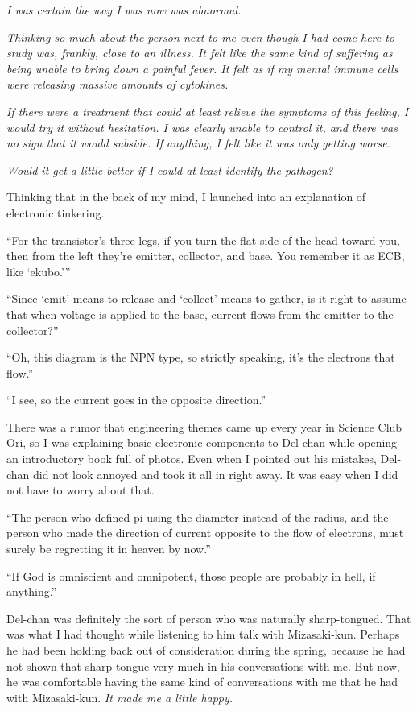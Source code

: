 \documentclass[
    a4paper,
    12pt,
    twoside,
    openany,
    UTF8,
    fontset=windows
]{ctexbook}
\begin{document}
\textit{I was certain the way I was now was abnormal.}

\textit{Thinking so much about the person next to me even though I had come here to study was, frankly, close to an illness. It felt like the same kind of suffering as being unable to bring down a painful fever. It felt as if my mental immune cells were releasing massive amounts of cytokines.}

\textit{If there were a treatment that could at least relieve the symptoms of this feeling, I would try it without hesitation. I was clearly unable to control it, and there was no sign that it would subside. If anything, I felt like it was only getting worse.}

\textit{Would it get a little better if I could at least identify the pathogen?}

Thinking that in the back of my mind, I launched into an explanation of electronic tinkering.

``For the transistor's three legs, if you turn the flat side of the head toward you, then from the left they're emitter, collector, and base. You remember it as ECB, like `ekubo.'''

``Since `emit' means to release and `collect' means to gather, is it right to assume that when voltage is applied to the base, current flows from the emitter to the collector?''

``Oh, this diagram is the NPN type, so strictly speaking, it's the electrons that flow.''

``I see, so the current goes in the opposite direction.''

There was a rumor that engineering themes came up every year in Science Club Ori, so I was explaining basic electronic components to Del-chan while opening an introductory book full of photos. Even when I pointed out his mistakes, Del-chan did not look annoyed and took it all in right away. It was easy when I did not have to worry about that.

``The person who defined pi using the diameter instead of the radius, and the person who made the direction of current opposite to the flow of electrons, must surely be regretting it in heaven by now.''

``If God is omniscient and omnipotent, those people are probably in hell, if anything.''

Del-chan was definitely the sort of person who was naturally sharp-tongued. That was what I had thought while listening to him talk with Mizasaki-kun. Perhaps he had been holding back out of consideration during the spring, because he had not shown that sharp tongue very much in his conversations with me. But now, he was comfortable having the same kind of conversations with me that he had with Mizasaki-kun. \textit{It made me a little happy.}
\end{document}

